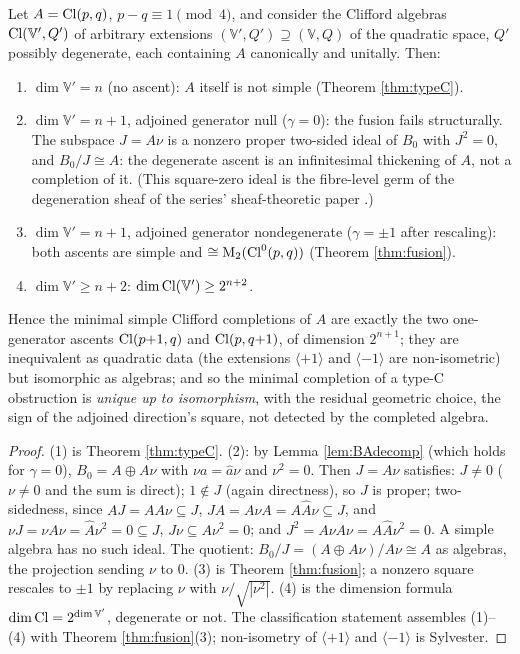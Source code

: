 \begin{theorem}\label{thm:rule2min}
Let $A = \mathrm{Cl}(p,q)$, $p - q \equiv 1 \pmod 4$, and consider the Clifford algebras $\mathrm{Cl}(\mathbb{V}', Q')$ of arbitrary extensions $(\mathbb{V}', Q') \supseteq (\mathbb{V}, Q)$ of the quadratic space, $Q'$ possibly degenerate, each containing $A$ canonically and unitally. Then:
\begin{enumerate}
\item $\dim \mathbb{V}' = n$ (no ascent): $A$ itself is not simple (Theorem \ref{thm:typeC}).
\item $\dim \mathbb{V}' = n + 1$, adjoined generator null ($\gamma = 0$): the fusion fails structurally. The subspace $J = A\nu$ is a nonzero proper two-sided ideal of $B_0$ with $J^2 = 0$, and $B_0 / J \cong A$: the degenerate ascent is an infinitesimal thickening of $A$, not a completion of it. (This square-zero ideal is the fibre-level germ of the degeneration sheaf of the series' sheaf-theoretic paper \cite{ButlerT4}.)
\item $\dim \mathbb{V}' = n + 1$, adjoined generator nondegenerate ($\gamma = \pm 1$ after rescaling): both ascents are simple and $\cong \mathrm{M}_2(\mathrm{Cl}^0(p,q))$ (Theorem \ref{thm:fusion}).
\item $\dim \mathbb{V}' \geq n + 2$: $\dim \mathrm{Cl}(\mathbb{V}') \geq 2^{n+2}$.
\end{enumerate}
Hence the minimal simple Clifford completions of $A$ are exactly the two one-generator ascents $\mathrm{Cl}(p{+}1,q)$ and $\mathrm{Cl}(p,q{+}1)$, of dimension $2^{n+1}$; they are inequivalent as quadratic data (the extensions $\langle +1 \rangle$ and $\langle -1 \rangle$ are non-isometric) but isomorphic as algebras; and so the minimal completion of a type-C obstruction is \emph{unique up to isomorphism}, with the residual geometric choice, the sign of the adjoined direction's square, not detected by the completed algebra.
\end{theorem}

\begin{proof}
(1) is Theorem \ref{thm:typeC}. (2): by Lemma \ref{lem:BAdecomp} (which holds for $\gamma = 0$), $B_0 = A \oplus A\nu$ with $\nu a = \hat{a}\nu$ and $\nu^2 = 0$. Then $J = A\nu$ satisfies: $J \neq 0$ ($\nu \neq 0$ and the sum is direct); $1 \notin J$ (again directness), so $J$ is proper; two-sidedness, since $A J = A A \nu \subseteq J$, $J A = A \nu A = A \hat{A} \nu \subseteq J$, and $\nu J = \nu A \nu = \hat{A} \nu^2 = 0 \subseteq J$, $J\nu \subseteq A\nu^2 = 0$; and $J^2 = A\nu A \nu = A \hat{A} \nu^2 = 0$. A simple algebra has no such ideal. The quotient: $B_0 / J = (A \oplus A\nu)/A\nu \cong A$ as algebras, the projection sending $\nu$ to $0$. (3) is Theorem \ref{thm:fusion}; a nonzero square rescales to $\pm 1$ by replacing $\nu$ with $\nu/\sqrt{|\nu^2|}$. (4) is the dimension formula $\dim \mathrm{Cl} = 2^{\dim \mathbb{V}'}$, degenerate or not. The classification statement assembles (1)--(4) with Theorem \ref{thm:fusion}(3); non-isometry of $\langle +1\rangle$ and $\langle -1 \rangle$ is Sylvester.
\end{proof}

